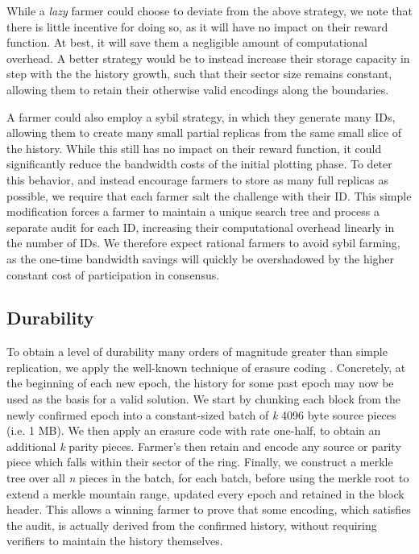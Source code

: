 \documentclass[conference]{IEEEtran}
\begin{document}
While a \textit{lazy} farmer could choose to deviate from the above strategy, we note that there is little incentive for doing so, as it will have no impact on their reward function. At best, it will save them a negligible amount of computational overhead. A better strategy would be to instead increase their storage capacity in step with the the history growth, such that their sector size remains constant, allowing them to retain their otherwise valid encodings along the boundaries.  

A farmer could also employ a sybil strategy, in which they generate many IDs, allowing them to create many small partial replicas from the same small slice of the history. While this still has no impact on their reward function, it could significantly reduce the bandwidth costs of the initial plotting phase. To deter this behavior, and instead encourage farmers to store as many full replicas as possible, we require that each farmer salt the challenge with their ID. This simple modification forces a farmer to maintain a unique search tree and process a separate audit for each ID, increasing their computational overhead linearly in the number of IDs. We therefore expect rational farmers to avoid sybil farming, as the one-time bandwidth savings will quickly be overshadowed by the higher constant cost of participation in consensus. 

\subsection{Durability}

To obtain a level of durability many orders of magnitude greater than simple replication, we apply the well-known technique of erasure coding \cite{reed1960polynomial}. Concretely, at the beginning of each new epoch, the history for some past epoch may now be used as the basis for a valid solution. We start by chunking each block from the newly confirmed epoch into a constant-sized batch of \textit{k} 4096 byte source pieces (i.e. 1 MB). We then apply an erasure code with rate one-half, to obtain an additional \textit{k} parity pieces. Farmer’s then retain and encode any source or parity piece which falls within their sector of the ring. Finally, we  construct a merkle tree over all \textit{n} pieces in the batch, for each batch, before using the merkle root to extend a merkle mountain range\cite{todd}, updated every epoch and retained in the block header. This allows a winning farmer to prove that some encoding, which satisfies the audit, is actually derived from the confirmed history, without requiring verifiers to maintain the history themselves.   
\end{document}

